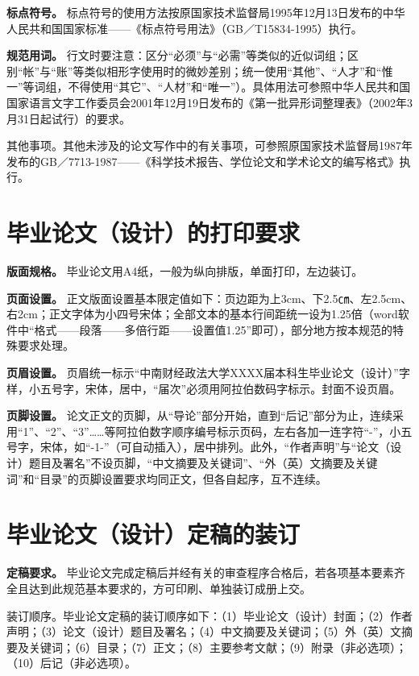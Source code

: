 \documentclass[doublesided]{Style/ucasthesis}%
\begin{document}
\textbf{标点符号。} 标点符号的使用方法按原国家技术监督局1995年12月13日发布的中华人民共和国国家标准------《标点符号用法》（GB／T15834-1995）执行。

\textbf{规范用词。} 行文时要注意：区分``必须''与``必需''等类似的近似词组；区别``帐''与``账''等类似相形字使用时的微妙差别；统一使用``其他''、``人才''和``惟一''等词组，不得使用``其它''、``人材''和``唯一''）。具体用法可参照中华人民共和国国家语言文字工作委员会2001年12月19日发布的《第一批异形词整理表》（2002年3月31日起试行）的要求。

其他事项。其他未涉及的论文写作中的有关事项，可参照原国家技术监督局1987年发布的GB／7713-1987------《科学技术报告、学位论文和学术论文的编写格式》执行。

\hypertarget{section-32}{%
\section{毕业论文（设计）的打印要求}\label{section-32}}

\textbf{版面规格。} 毕业论文用A4纸，一般为纵向排版，单面打印，左边装订。

\textbf{页面设置。} 正文版面设置基本限定值如下：页边距为上3cm、下2.5㎝、左2.5cm、右2cm；正文字体为小四号宋体；全部文本的基本行间距统一设为1.25倍（word软件中``格式------段落------多倍行距------设置值1.25''即可），部分地方按本规范的特殊要求处理。

\textbf{页眉设置。} 页眉统一标示``中南财经政法大学XXXX届本科生毕业论文（设计）''字样，小五号字，宋体，居中，``届次''必须用阿拉伯数码字标示。封面不设页眉。

\textbf{页脚设置。} 论文正文的页脚，从``导论''部分开始，直到``后记''部分为止，连续采用``1''、``2''、``3''\ldots{}\ldots{}等阿拉伯数字顺序编号标示页码，左右各加一连字符``-''，小五号字，宋体，如``-1-''（可自动插入），居中排列。此外，``作者声明''与``论文（设计）题目及署名''不设页脚，``中文摘要及关键词''、``外（英）文摘要及关键词''和``目录''的页脚设置要求均同正文，但各自起序，互不连续。

\hypertarget{section-33}{%
\section{毕业论文（设计）定稿的装订}\label{section-33}}

\textbf{定稿要求。} 毕业论文完成定稿后并经有关的审查程序合格后，若各项基本要素齐全且达到此规范基本要求的，方可印刷、单独装订成册上交。

装订顺序。毕业论文定稿的装订顺序如下：（1）毕业论文（设计）封面；（2）作者声明；（3）论文（设计）题目及署名；（4）中文摘要及关键词；（5）外（英）文摘要及关键词；（6）目录；（7）正文；（8）主要参考文献；（9）附录（非必选项）；（10）后记（非必选项）。
\end{document}
